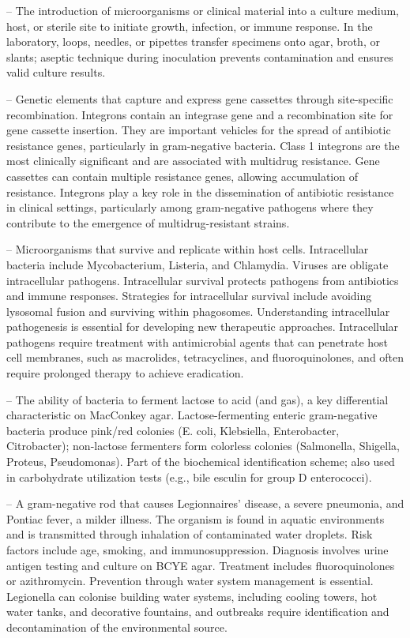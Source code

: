-- The introduction of microorganisms or clinical material into a culture medium, host, or sterile site to initiate growth, infection, or immune response. In the laboratory, loops, needles, or pipettes transfer specimens onto agar, broth, or slants; aseptic technique during inoculation prevents contamination and ensures valid culture results.

-- Genetic elements that capture and express gene cassettes through site-specific recombination. Integrons contain an integrase gene and a recombination site for gene cassette insertion. They are important vehicles for the spread of antibiotic resistance genes, particularly in gram-negative bacteria. Class 1 integrons are the most clinically significant and are associated with multidrug resistance. Gene cassettes can contain multiple resistance genes, allowing accumulation of resistance. Integrons play a key role in the dissemination of antibiotic resistance in clinical settings, particularly among gram-negative pathogens where they contribute to the emergence of multidrug-resistant strains.

-- Microorganisms that survive and replicate within host cells. Intracellular bacteria include Mycobacterium, Listeria, and Chlamydia. Viruses are obligate intracellular pathogens. Intracellular survival protects pathogens from antibiotics and immune responses. Strategies for intracellular survival include avoiding lysosomal fusion and surviving within phagosomes. Understanding intracellular pathogenesis is essential for developing new therapeutic approaches. Intracellular pathogens require treatment with antimicrobial agents that can penetrate host cell membranes, such as macrolides, tetracyclines, and fluoroquinolones, and often require prolonged therapy to achieve eradication.

-- The ability of bacteria to ferment lactose to acid (and gas), a key differential characteristic on MacConkey agar. Lactose-fermenting enteric gram-negative bacteria produce pink/red colonies (E. coli, Klebsiella, Enterobacter, Citrobacter); non-lactose fermenters form colorless colonies (Salmonella, Shigella, Proteus, Pseudomonas). Part of the biochemical identification scheme; also used in carbohydrate utilization tests (e.g., bile esculin for group D enterococci).

-- A gram-negative rod that causes Legionnaires' disease, a severe pneumonia, and Pontiac fever, a milder illness. The organism is found in aquatic environments and is transmitted through inhalation of contaminated water droplets. Risk factors include age, smoking, and immunosuppression. Diagnosis involves urine antigen testing and culture on BCYE agar. Treatment includes fluoroquinolones or azithromycin. Prevention through water system management is essential. Legionella can colonise building water systems, including cooling towers, hot water tanks, and decorative fountains, and outbreaks require identification and decontamination of the environmental source.

